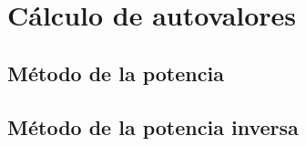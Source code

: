 
\section{Cálculo de autovalores}
\subsection{Método de la potencia}
\subsection{Método de la potencia inversa}
